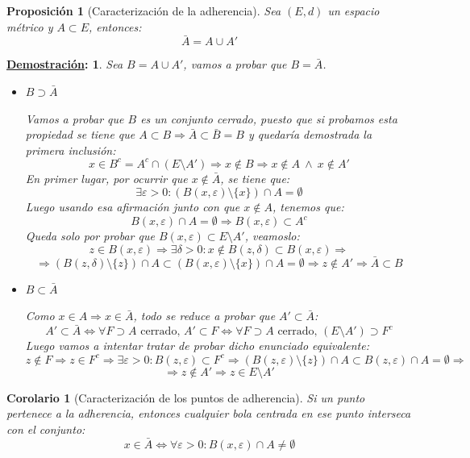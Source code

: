 \documentclass[10pt,a4paper,openright]{book}
\theoremstyle{break}
\newtheorem*{coro}{Corolario}
\newtheorem*{prop}{Proposición}
\newtheorem*{demo}{\underline{Demostración}:}
\begin{document}
\begin{prop}[Caracterización de la adherencia]
Sea $(E,d)$ un espacio métrico y $A\subset E$, entonces:
$$\bar{A} = A \cup A'$$
\end{prop}

\begin{demo}
Sea $B= A\cup A'$, vamos a probar que $B=\bar{A}$.
\begin{itemize}
\item $B \supset \bar{A}$

Vamos a probar que $B$ es un conjunto cerrado, puesto que si probamos esta propiedad se tiene que $A\subset B\Rightarrow \bar{A}\subset \bar{B} = B$ y quedaría demostrada la primera inclusión:
$$x \in B^{c} = A^{c} \cap (E\setminus A')\Rightarrow x\notin B \Rightarrow x\notin A \ \wedge \ x\notin A'$$
En primer lugar, por ocurrir que $x\notin \bar{A}$, se tiene que:
$$\exists \varepsilon > 0 : \left( B(x,\varepsilon)\setminus\{x\}\right)\cap A = \emptyset$$
Luego usando esa afirmación junto con que $x\notin A$, tenemos que:
$$B(x,\varepsilon)\cap A = \emptyset\Rightarrow B(x,\varepsilon) \subset A^{c}$$
Queda solo por probar que $B(x,\varepsilon)\subset E\setminus A'$, veamoslo:
$$z\in B(x,\varepsilon)\Rightarrow \exists \delta > 0 : x\notin B(z, \delta)\subset B(x,\varepsilon) \Rightarrow$$
$$\Rightarrow \left(B(z,\delta)\setminus \{z\}\right)\cap A \subset \left(B(x,\varepsilon)\setminus\{x\}\right)\cap A = \emptyset\Rightarrow z \notin A' \Rightarrow \bar{A}\subset B$$

\item $B\subset \bar{A}$

Como $x\in A\Rightarrow x \in \bar{A}$, todo se reduce a probar que $A'\subset \bar{A}$:
$$A'\subset \bar{A} \Leftrightarrow \forall F\supset A \mbox{ cerrado, } A'\subset F \Leftrightarrow \forall F \supset A \mbox{ cerrado, }(E\setminus A')\supset F^{c}$$
Luego vamos a intentar tratar de probar dicho enunciado equivalente:
$$z\notin F \Rightarrow z \in F^{c} \Rightarrow \exists \varepsilon > 0 : B(z,\varepsilon)\subset F^{c}\Rightarrow \left(B(z,\varepsilon)\setminus\{z\}\right)\cap A \subset B(z,\varepsilon)\cap A = \emptyset \Rightarrow$$
$$\Rightarrow z \notin A' \Rightarrow z \in E\setminus A'$$
\end{itemize}
\end{demo}

\begin{coro}[Caracterización de los puntos de adherencia]
Si un punto pertenece a la adherencia, entonces cualquier bola centrada en ese punto interseca con el conjunto:
$$x\in \bar{A}\Leftrightarrow \forall \varepsilon >0: B(x,\varepsilon)\cap A \neq \emptyset$$
\end{coro}
\end{document}

